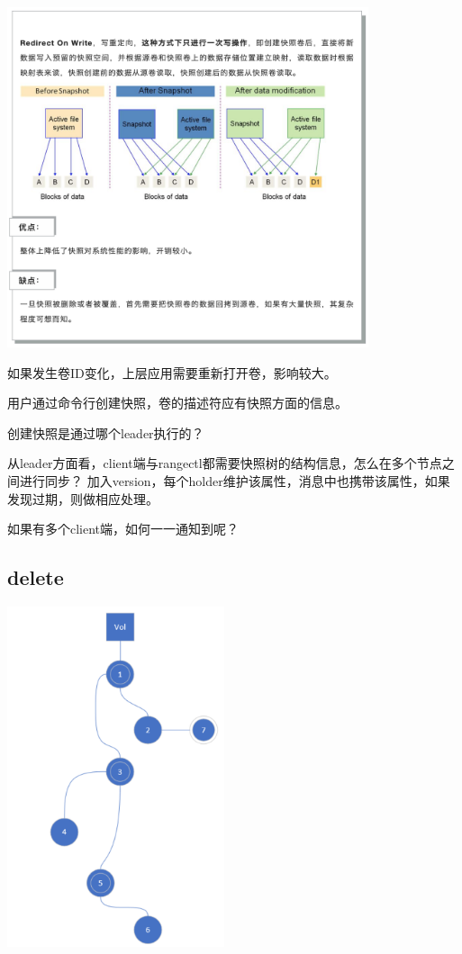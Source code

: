 \begin{center}
\includegraphics[height=10cm]{../imgs/snapshot/row-snapshot.png}
\end{center}

如果发生卷ID变化，上层应用需要重新打开卷，影响较大。

用户通过命令行创建快照，卷的描述符应有快照方面的信息。

创建快照是通过哪个leader执行的？

从leader方面看，client端与rangectl都需要快照树的结构信息，怎么在多个节点之间进行同步？
加入version，每个holder维护该属性，消息中也携带该属性，如果发现过期，则做相应处理。

如果有多个client端，如何一一通知到呢？

\subsection{delete}

\begin{center}
\includegraphics[height=10cm]{../imgs/snapshot/snaptree.png}
\end{center}

